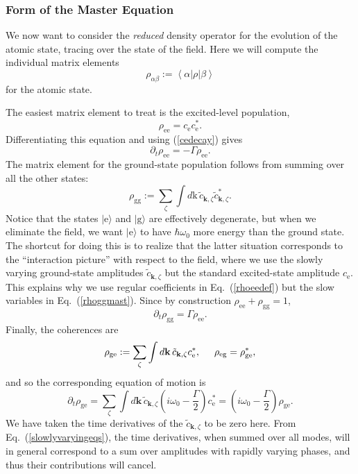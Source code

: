 \documentclass[12pt,aps,onecolum,superscriptaddress,footinbib,floatfix,showpacs]{revtex4-1}
\def\ket#1{|{#1}\rangle}
\def\expct#1{\!\left\langle{#1}\right\rangle}
\def\eket{\ket{\mathrm{e}}}
\def\gket{\ket{\mathrm{g}}}
\def\ce{c_\mathrm{e}}
\def\ckzt{\tilde c_{\mathbf{k},\zeta}}
\begin{document}
\subsubsection{Form of the Master Equation}

We now want to consider the \textit{reduced}
density operator for the evolution of the atomic state,
tracing over the state of the field.
Here we will compute the individual matrix elements 
\begin{equation}
  \rho_{\alpha\beta}:=\expct{\alpha|\rho|\beta}
\end{equation}
for the atomic state.

The easiest matrix element to treat is the excited-level population,
\begin{equation}
  \rho_{\mathrm{ee}} = \ce\ce^*.
  \label{rhoeedef}
\end{equation}
Differentiating this equation and using (\ref{cedecay}) gives
\begin{equation}
  \partial_t \rho_\mathrm{ee} = -\Gamma \rho_\mathrm{ee}.
  \label{rhoeedecay}
\end{equation}
The matrix element for the ground-state population follows from summing
over all the other states:
\begin{equation}
  \rho_\mathrm{gg} :=  \sum_{\zeta}\int d\mathrm{k}\, \ckzt\ckzt^*.
  \label{rhoggmast}
\end{equation}
Notice that the states $\eket$ and $\gket$ are effectively degenerate,
but when we eliminate the field, we want $\eket$ to have $\hbar\omega_0$
more energy than the ground state.  The shortcut for doing this
is to realize that the latter situation corresponds to the 
``interaction picture'' with respect to the field, where
we use the slowly varying ground-state
amplitudes $\ckzt$ but the standard excited-state amplitude $\ce$.
This explains why we use regular coefficients in
Eq.~(\ref{rhoeedef})
but the slow variables in
Eq.~(\ref{rhoggmast}).
Since by construction $\rho_\mathrm{ee} + \rho_\mathrm{gg} = 1$,
\begin{equation}
  \partial_t \rho_\mathrm{gg} = \Gamma \rho_\mathrm{ee}.
\end{equation}
Finally, the coherences are
\begin{equation}
  \rho_\mathrm{ge} := \sum_\zeta\int d\mathbf{k}\,\ckzt \ce^*,
  \hspace{5mm}\rho_\mathrm{eg}=\rho_\mathrm{ge}^*,
\end{equation}
and so the corresponding equation of motion is
\begin{equation}
  \partial_t\rho_\mathrm{ge} = \sum_\zeta\int d\mathbf{k}\,\ckzt 
   \left(i\omega_0 -\frac{\Gamma}{2}\right)\ce^*
   = \left(i\omega_0 -\frac{\Gamma}{2}\right)\rho_\mathrm{ge}.
\end{equation}
We have taken the time derivatives of the $\ckzt$ to be zero here. From 
Eq.~(\ref{slowlyvaryingeqs}), the time derivatives, when summed over all
modes, will in general correspond to a sum over amplitudes with
rapidly varying phases, and thus their contributions will cancel.
\end{document}
